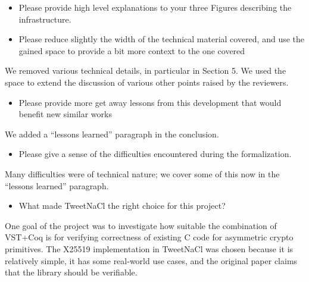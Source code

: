 \begin{center}
\end{center}
\begin{itemize}
  \item Please provide high level explanations to your three Figures describing the infrastructure.
\end{itemize}
\begin{answer}
\end{answer}
\begin{itemize}
  \item Please reduce slightly the width of the technical material covered, and use the gained space to provide a bit more context to the one covered
\end{itemize}
\begin{answer}
  We removed various technical details, in particular in Section 5. We used the space to extend the discussion
  of various other points raised by the reviewers.
\end{answer}
\begin{itemize}
  \item Please provide more get away lessons from this development that would benefit new similar works
\end{itemize}
\begin{answer}
  We added a ``lessons learned'' paragraph in the conclusion.
\end{answer}
\begin{itemize}
  \item Please give a sense of the difficulties encountered during the formalization.
\end{itemize}
\begin{answer}
  Many difficulties were of technical nature; we cover some of this now in the ``lessons learned'' paragraph.
\end{answer}

\begin{center}
\end{center}

\begin{itemize}
  \item What made TweetNaCl the right choice for this project?
\end{itemize}

\begin{answer}
  One goal of the project was to investigate how suitable the combination of
  VST+Coq is for verifying correctness of existing C code for asymmetric
  crypto primitives. The X25519 implementation in TweetNaCl was chosen because
  it is relatively simple, it has some real-world use cases, and the original
  paper claims that the library should be verifiable.
\end{answer}

